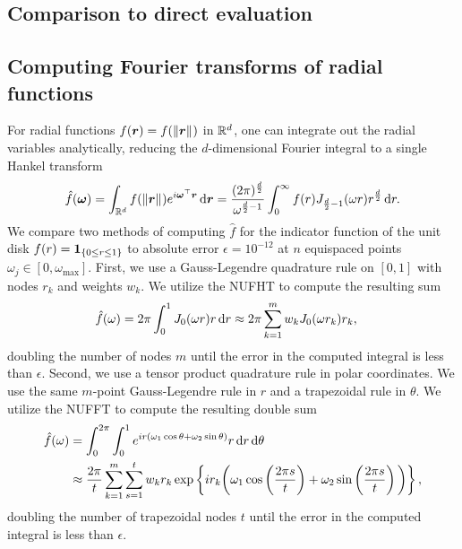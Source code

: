 \subsection{Comparison to direct evaluation}


\subsection{Computing Fourier transforms of radial functions}
For radial functions $f(\bm{r}) = f(\left\Vert\bm{r}\right\Vert_{})$ in $\mathbb{R}^d$, one can integrate
out the radial variables analytically, reducing the $d$-dimensional Fourier
integral to a single Hankel transform
\begin{align}
    \hat{f}(\bm{\omega}) 
    = \int_{\mathbb{R}^d} f(\left\Vert\bm{r}\right\Vert_{}) e^{i\bm{\omega}^\top \bm{r}} \mathop{}\!\mathrm{d}{\bm{r}}
    = \frac{(2\pi)^{\frac{d}{2}}}{\omega^{\frac{d}{2} - 1}} \int_0^\infty f(r) J_{\frac{d}{2} - 1}(\omega r) r^{\frac{d}{2}} \mathop{}\!\mathrm{d}{r}.
\end{align}
We compare two methods of computing $\hat{f}$ for the indicator function of the
unit disk $f(r) = \bm{1}_{\left\{ 0 \leq r \leq 1\right\}}$ to absolute error $\epsilon = 10^{-12}$
at $n$ equispaced points $\omega_j \in [0, \omega_{\text{max}}]$. First, we use
a Gauss-Legendre quadrature rule on $[0,1]$ with nodes $r_k$ and weights $w_k$.
We utilize the NUFHT to compute the resulting sum
\begin{align}
  \hat{f}(\omega) 
  &= 2\pi\int_0^1 J_0(\omega r) r \mathop{}\!\mathrm{d}{r}
  \approx 2\pi \sum_{k=1}^m w_k J_0(\omega r_k) r_k,
\end{align}
doubling the number of nodes $m$ until the error in the computed integral is
less than $\epsilon$. Second, we use a tensor product quadrature rule in polar
coordinates. We use the same $m$-point Gauss-Legendre rule in $r$ and a
trapezoidal rule in $\theta$. We utilize the NUFFT to compute the resulting
double sum
\begin{align}
  \hat{f}(\omega) 
  &= \int_0^{2\pi} \int_0^1 e^{ir(\omega_1\cos\theta + \omega_2\sin\theta)} r \mathop{}\!\mathrm{d}{r} \mathop{}\!\mathrm{d}{\theta} \\
  &\approx \frac{2\pi}{t} \sum_{k=1}^{m} \sum_{s=1}^{t} w_k r_k \exp\left\{ir_k\bigg(\omega_1\cos\left(\frac{2\pi s}{t}\right) + \omega_2\sin\left(\frac{2\pi s}{t}\right)\bigg)\right\},
\end{align}
doubling the number of trapezoidal nodes $t$ until the error in the computed
integral is less than $\epsilon$.

